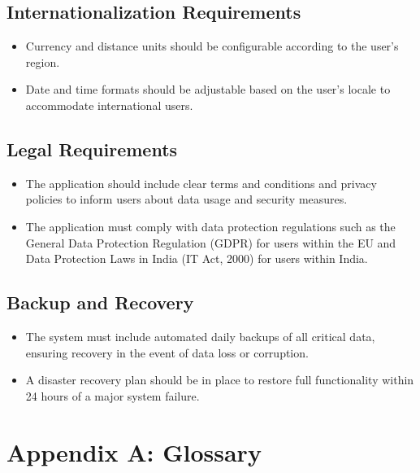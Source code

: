 \subsection{Internationalization Requirements}

\begin{itemize}
    \item Currency and distance units should be configurable according to the user's region.
    \item Date and time formats should be adjustable based on the user's locale to accommodate international users.
\end{itemize}

\subsection{Legal Requirements}

\begin{itemize}
    \item The application should include clear terms and conditions and privacy policies to inform users about data usage and security measures.
    \item The application must comply with data protection regulations such as the General Data Protection Regulation (GDPR) for users within the EU and Data Protection Laws in India (IT Act, 2000) for users within India.
\end{itemize}

\subsection{Backup and Recovery}

\begin{itemize}
    \item The system must include automated daily backups of all critical data, ensuring recovery in the event of data loss or corruption.
    \item A disaster recovery plan should be in place to restore full functionality within 24 hours of a major system failure.
\end{itemize}

\section{Appendix A: Glossary}

